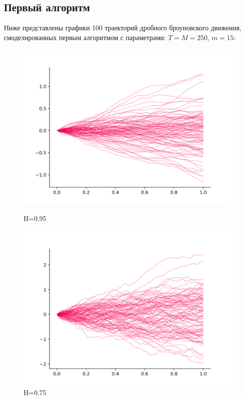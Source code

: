 \documentclass[a4paper,12pt]{article}
\numberwithin{equation}{section}
\begin{document}
	\subsection{Первый алгоритм}
	Ниже представлены графики 100 траекторий дробного броуновского движения, смоделированных первым алгоритмом с параметрами: $T=M=250$, $m=15$:
	\begin{figure}[H]
		\includegraphics[scale=0.4]{image-1-95.png}
		\caption{H=0.95}
		\endminipage\hfill
		\includegraphics[scale=0.4]{image-1-75.png}
		\caption{H=0.75}
		\endminipage\hfill
	\end{figure}
	
\end{document}
